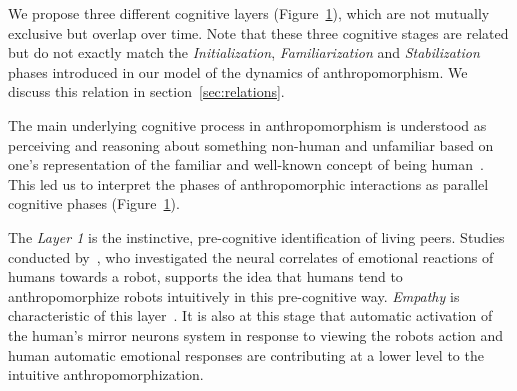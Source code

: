 \documentclass{frontiersSCNS} %
\begin{document}
\begin{figure}[htb]
\label{fig:cognitivemodel}
\end{figure}

We propose three different cognitive layers (Figure~\ref{fig:cognitivemodel}),
which are not mutually exclusive but overlap over time. Note that these three
cognitive stages are related but do not exactly match the \emph{Initialization},
\emph{Familiarization} and \emph{Stabilization} phases introduced in our model
of the dynamics of anthropomorphism. We discuss this relation in
section~\ref{sec:relations}.

The main underlying cognitive process in anthropomorphism is understood as
perceiving and reasoning about something non-human and unfamiliar based on one's
representation of the familiar and well-known concept of being
human~\citep{epley_when_2008}. This led us to interpret the phases of
anthropomorphic interactions as parallel cognitive phases
(Figure~\ref{fig:cognitivemodel}).

The \emph{Layer 1} is the instinctive, pre-cognitive identification of living
peers. Studies conducted by~\citet{rosenthal-vonderputten_experimental_2013},
who investigated the neural correlates of emotional reactions of humans towards
a robot, supports the idea that humans tend to anthropomorphize robots
intuitively in this pre-cognitive way. {\it Empathy} is characteristic of this
layer~\citep{rosenthalvonderPutten2013neural}.  It is also at this stage that
automatic activation of the human's mirror neurons system  in response to
viewing the robots action and human automatic emotional responses are
contributing at a lower level to the intuitive anthropomorphization.
\end{document}

